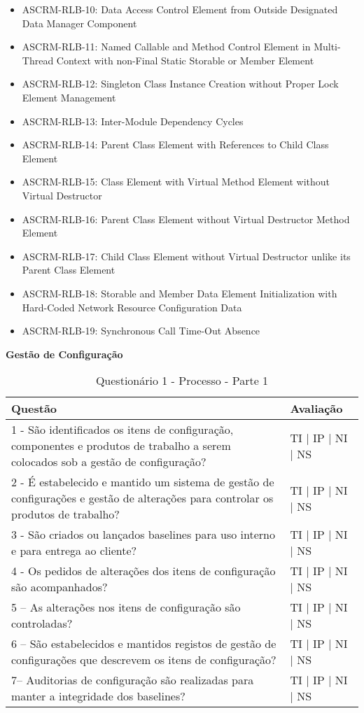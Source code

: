 \documentclass[openany,10pt,a4paper]{article}
\begin{document}
\begin{longtable}
\begin{appendix}
\begin{itemize}
	\item ASCRM-RLB-10: Data Access Control Element from Outside Designated Data Manager Component
	\item ASCRM-RLB-11: Named Callable and Method Control Element in Multi-Thread Context with non-Final Static Storable or Member Element
	\item ASCRM-RLB-12: Singleton Class Instance Creation without Proper Lock Element Management
	\item ASCRM-RLB-13: Inter-Module Dependency Cycles
	\item ASCRM-RLB-14: Parent Class Element with References to Child Class Element
	\item ASCRM-RLB-15: Class Element with Virtual Method Element without Virtual Destructor
	\item ASCRM-RLB-16: Parent Class Element without Virtual Destructor Method Element
	\item ASCRM-RLB-17: Child Class Element without Virtual Destructor unlike its Parent Class Element
	\item ASCRM-RLB-18: Storable and Member Data Element Initialization with Hard-Coded Network Resource Configuration Data
	\item ASCRM-RLB-19: Synchronous Call Time-Out Absence
\end{itemize}




\begin{table}[h]
\textbf{Gestão de Configuração}
	\centering
	\caption{Questionário 1 - Processo - Parte 1}
	\begin{tabular}{p{3.5in}p{2in}}		
		\toprule
		\textbf{Questão}  & \textbf{Avaliação}\\ 
		\midrule
		1 - São identificados os itens de configuração, componentes e produtos de trabalho a serem 
colocados sob a gestão de configuração?
 & TI | IP | NI | NS \\
        \midrule
		2 - É estabelecido e mantido um sistema de gestão de configurações e gestão de alterações para 
controlar os produtos de trabalho?
 & TI | IP | NI | NS \\
		\midrule
		3 -  São criados ou lançados baselines para uso interno e para entrega ao cliente?
 & TI | IP | NI | NS \\
		\midrule
		4 - Os pedidos de alterações dos itens de configuração são acompanhados?
 & TI | IP | NI | NS \\
		\midrule
		5 – As alterações nos itens de configuração são controladas?
  & TI | IP | NI | NS \\
		\midrule
		6 – São estabelecidos e mantidos registos de gestão de configurações que descrevem os itens 
de configuração?
 & TI | IP | NI | NS \\
		\midrule
		7– Auditorias de configuração são realizadas para manter a integridade dos baselines?
 & TI | IP | NI | NS \\
		\bottomrule
	\end{tabular} 
	\label{tab:tabela1}
\end{table}


\end{appendix}
\end{longtable}
\end{document}
